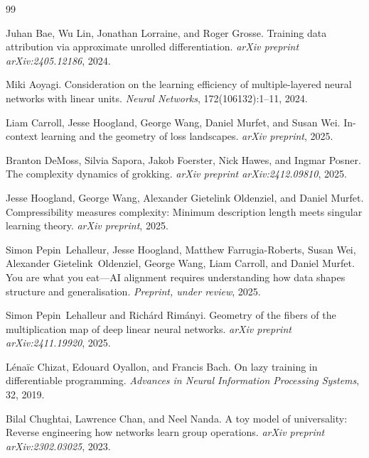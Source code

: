 \documentclass[11pt,a4paper]{article}
\begin{document}
\begin{thebibliography}{99}

Juhan Bae, Wu Lin, Jonathan Lorraine, and Roger Grosse.
\newblock Training data attribution via approximate unrolled differentiation.
\newblock \emph{arXiv preprint arXiv:2405.12186}, 2024.

Miki Aoyagi.
\newblock Consideration on the learning efficiency of multiple-layered neural networks with linear units.
\newblock \emph{Neural Networks}, 172(106132):1--11, 2024.

Liam Carroll, Jesse Hoogland, George Wang, Daniel Murfet, and Susan Wei.
\newblock In-context learning and the geometry of loss landscapes.
\newblock \emph{arXiv preprint}, 2025.

Branton DeMoss, Silvia Sapora, Jakob Foerster, Nick Hawes, and Ingmar Posner.
\newblock The complexity dynamics of grokking.
\newblock \emph{arXiv preprint arXiv:2412.09810}, 2025.

Jesse Hoogland, George Wang, Alexander Gietelink Oldenziel, and Daniel Murfet.
\newblock Compressibility measures complexity: Minimum description length meets singular learning theory.
\newblock \emph{arXiv preprint}, 2025.

Simon Pepin~Lehalleur, Jesse Hoogland, Matthew Farrugia-Roberts, Susan Wei, Alexander Gietelink~Oldenziel, George Wang, Liam Carroll, and Daniel Murfet.
\newblock You are what you eat---{AI} alignment requires understanding how data shapes structure and generalisation.
\newblock \emph{Preprint, under review}, 2025.

Simon Pepin~Lehalleur and Rich\'{a}rd Rim\'{a}nyi.
\newblock Geometry of the fibers of the multiplication map of deep linear neural networks.
\newblock \emph{arXiv preprint arXiv:2411.19920}, 2025.

L\'{e}na\"{i}c Chizat, Edouard Oyallon, and Francis Bach.
\newblock On lazy training in differentiable programming.
\newblock \emph{Advances in Neural Information Processing Systems}, 32, 2019.

Bilal Chughtai, Lawrence Chan, and Neel Nanda.
\newblock A toy model of universality: Reverse engineering how networks learn group operations.
\newblock \emph{arXiv preprint arXiv:2302.03025}, 2023.


\end{thebibliography}
\end{document}
